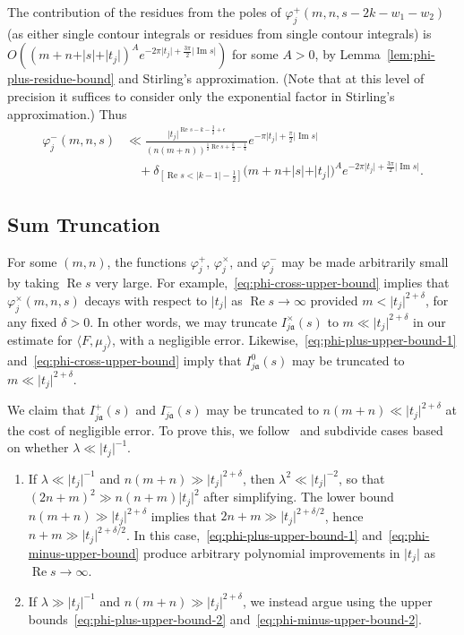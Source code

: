 \documentclass[11pt,reqno]{amsart}
\theoremstyle{plain}
\theoremstyle{definition}
\numberwithin{equation}{section}
\renewcommand{\Im}{\operatorname{Im}}
\renewcommand{\Re}{\operatorname{Re}}
\begin{document}
The contribution of the residues from the poles of $\varphi_j^+(m,n,s-2k-w_1-w_2)$ (as either single contour integrals or residues from single contour integrals) is $O((m+n+\vert s \vert + \vert t_j \vert)^A e^{-2\pi \vert t_j \vert + \frac{3\pi}{2} \vert \Im s \vert})$ for some $A>0$, by Lemma~\ref{lem:phi-plus-residue-bound} and Stirling's approximation. (Note that at this level of precision it suffices to consider only the exponential factor in Stirling's approximation.) Thus
\begin{align} \label{eq:phi-minus-upper-bound-2}
	\varphi_j^-(m,n,s)
	& \ll \frac{\vert t_j \vert^{\Re s - k - \frac{3}{2} + \epsilon}}
				{(n(m+n))^{\frac{1}{2}\Re s  + \frac{k}{2} - \frac{1}{4}}}
		e^{-\pi \vert t_j \vert + \frac{\pi}{2} \vert \Im s \vert} \\
	& \quad 
		+ \delta_{[\Re s < \vert k - 1 \vert - \frac{1}{2}]}
		\big(m+n+\vert s \vert + \vert t_j \vert\big)^A
		e^{-2\pi \vert t_j \vert + \frac{3\pi}{2} \vert \Im s \vert}.
\end{align}

\subsection{Sum Truncation} \label{sec:sum-truncation}

For some $(m,n)$, the functions $\varphi_j^+$, $\varphi_j^\times$, and $\varphi_j^-$ may be made arbitrarily small by taking $\Re s$ very large. For example,~\eqref{eq:phi-cross-upper-bound} implies that $\varphi_j^\times(m,n,s)$ decays with respect to $\vert t_j \vert$ as $\Re s \to \infty$ provided $m< \vert t_j \vert^{2+\delta}$, for any fixed $\delta > 0$. In other words, we may truncate $I_{j \mathfrak{a}}^\times(s)$ to $m \ll \vert t_j \vert^{2+\delta}$ in our estimate for $\langle F, \mu_j \rangle$, with a negligible error. Likewise,~\eqref{eq:phi-plus-upper-bound-1} and~\eqref{eq:phi-cross-upper-bound} imply that $I_{j \mathfrak{a}}^0(s)$ may be truncated to $m \ll \vert t_j \vert^{2+\delta}$.

We claim that $I_{j\mathfrak{a}}^+(s)$ and $I_{j\mathfrak{a}}^-(s)$ may be truncated to $n(m+n) \ll \vert t_j \vert^{2+\delta}$ at the cost of negligible error. To prove this, we follow~\cite[(3.25)]{Jutila96} and subdivide cases based on whether $\lambda \ll \vert t_j \vert^{-1}$.
\begin{enumerate}
\item[a.] If $\lambda \ll \vert t_j \vert^{-1}$ and $n(m+n) \gg \vert t_j \vert^{2+\delta}$, then $\lambda^2 \ll \vert t_j \vert^{-2}$, so that $(2n+m)^2 \gg n(n+m) \vert t_j \vert^2$ after simplifying. The lower bound $n(m+n) \gg \vert t_j \vert^{2+\delta}$ implies that $2n+m \gg \vert t_j \vert^{2+\delta/2}$, hence $n+m \gg \vert t_j \vert^{2+\delta/2}$. In this case,~\eqref{eq:phi-plus-upper-bound-1} and~\eqref{eq:phi-minus-upper-bound} produce arbitrary polynomial improvements in $\vert t_j \vert$ as $\Re s \to \infty$.
\item[b.] If $\lambda \gg \vert t_j \vert^{-1}$ and $n(m+n) \gg \vert t_j \vert^{2+\delta}$, we instead argue using the upper bounds~\eqref{eq:phi-plus-upper-bound-2} and~\eqref{eq:phi-minus-upper-bound-2}.
\end{enumerate}
\end{document}
